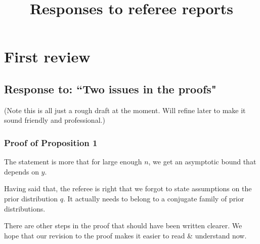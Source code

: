 \documentclass[]{article}
\title{Responses to referee reports}
\begin{document}
\maketitle


\section{First review}
\subsection{Response to: ``Two issues in the proofs"}
(Note this is all just a rough draft at the moment. Will refine later to make it sound friendly and professional.)
\subsubsection{Proof of Proposition 1}
The statement is more that for large enough $n$, we get an asymptotic bound that depends on $y$.

Having said that, the referee is right that we forgot to state assumptions on the prior distribution $q$.
It actually needs to belong to a conjugate family of prior distributions.

There are other steps in the proof that should have been written clearer.
We hope that our revision to the proof makes it easier to read \& understand now.
\end{document}

